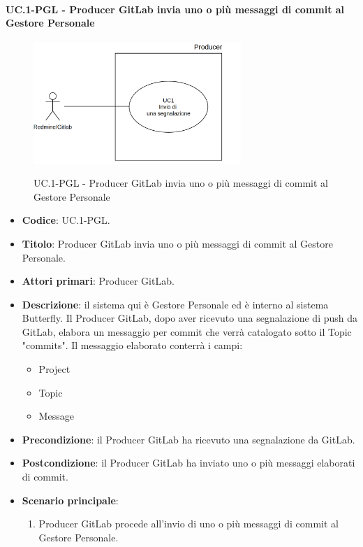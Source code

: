 	\paragraph{UC\theuccount.1-PGL - Producer GitLab invia uno o più messaggi di commit al Gestore Personale}
	\begin{figure}[H]
		\centering
		\includegraphics[width=0.7\textwidth]{img/UC1.png}\\
		\caption{UC\theuccount.1-PGL - Producer GitLab invia uno o più messaggi di commit al Gestore Personale}
	\end{figure}
	\begin{itemize}
		\item \textbf{Codice}: UC\theuccount.1-PGL.
		\item \textbf{Titolo}: Producer GitLab invia uno o più messaggi di commit al Gestore Personale.
		\item \textbf{Attori primari}: Producer GitLab.
		\item \textbf{Descrizione}: il sistema qui è Gestore Personale ed è interno al sistema Butterfly. Il Producer GitLab, dopo
		aver ricevuto una segnalazione di push da GitLab, elabora un messaggio per commit che verrà catalogato sotto il Topic "commits".
		Il messaggio elaborato conterrà i campi:
		\begin{itemize}
			\item Project
			\item Topic
			\item Message
		\end{itemize}
		\item \textbf{Precondizione}: il Producer GitLab ha ricevuto una segnalazione da GitLab.
		\item \textbf{Postcondizione}: il Producer GitLab ha inviato uno o più messaggi elaborati di commit.
		\item \textbf{Scenario principale}: 
		\begin{enumerate}
			\item Producer GitLab procede all'invio di uno o più messaggi
		 di commit al Gestore Personale.
		\end{enumerate}
		
	\end{itemize}

